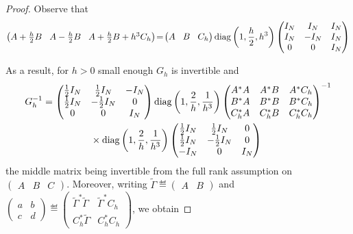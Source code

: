 \begin{proof}
    Observe that 
\begin{align*}
\begin{pmatrix}
 A+\frac{h}{2}B & \!A-\frac{h}{2}B & \!A+\frac{h}{2}B+ h^3 C_h
\end{pmatrix}
	\!=\!
	\begin{pmatrix} A\! & B\! & C_h  \end{pmatrix}
\operatorname{diag}\left(1, \frac{h}{2}, h^3 \right)
  \begin{pmatrix}I_N & I_N & I_N\\ I_N &-I_N & I_N\\ 0 & 0 &I_N  \end{pmatrix}
\end{align*}

As a result, for $h>0$ small enough $G_h$ is invertible and 
\begin{align*}
  G_h^{-1}&=\begin{pmatrix}\frac{1}{2} I_N & \frac{1}{2} I_N & -I_N\\ \frac{1}{2}I_N &-\frac{1}{2} I_N & 0\\ 0 & 0 &I_N  \end{pmatrix}
  \diag\left(1,\frac{2}{h},\frac{1}{h^3}\right)
  \begin{pmatrix} A^*A & A^*B & A^*C_h\\ B^*A & B^*B& B^*C_h\\ C_h^*A & C_h^*B & C_h^*C_h\end{pmatrix}^{-1}\\
 &\qquad \qquad\times\diag\left(1,\frac{2}{h},\frac{1}{h^3}\right)
  \begin{pmatrix}\frac{1}{2} I_N & \frac{1}{2} I_N & 0\\ \frac{1}{2}I_N &-\frac{1}{2} I_N & 0\\ -I_N & 0 &I_N  \end{pmatrix}
\end{align*}
the middle matrix being invertible from the full rank assumption on $\begin{pmatrix}A & B & C\end{pmatrix}$. Moreover, 
 writing  $\tilde{\Gamma}\eqdef\begin{pmatrix}A & B\end{pmatrix}$ and $\begin{pmatrix} a & b\\ c & d\end{pmatrix}\eqdef \begin{pmatrix} \tilde{\Gamma}^*\tilde{\Gamma} & \tilde{\Gamma}^*C_h \\ C_h^*\tilde{\Gamma} & C_h^*C_h\end{pmatrix}$,  we obtain 

\end{proof}
